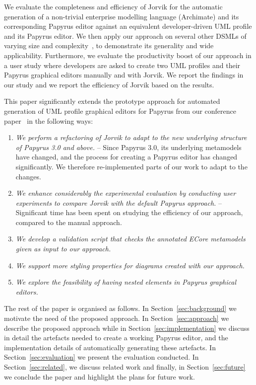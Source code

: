 We evaluate the completeness and efficiency of Jorvik for the automatic generation of a non-trivial enterprise modelling language (Archimate) and its corresponding Papyrus editor against an equivalent developer-driven UML profile and its Papyrus editor. 
We then apply our approach on several other DSMLs of varying size and complexity~\cite{williams2013metamodels}, to demonstrate its generality and wide applicability. 
Furthermore, we evaluate the productivity boost of our approach in a user study where developers are asked to create two UML profiles and their Papyrus graphical editors manually and with Jorvik.
We report the findings in our study and we report the efficiency of Jorvik based on the results. 

This paper significantly extends the prototype approach for automated generation of UML profile graphical editors for Papyrus from our conference paper~\cite{zolotas2018towards} in the following ways:
\begin{enumerate}
	\item \textit{We perform a refactoring of Jorvik to adapt to the new underlying structure of Papyrus 3.0 and above.} --
	Since Papyrus 3.0, its underlying metamodels have changed, and the process for creating a Papyrus editor has changed significantly. 
	We therefore re-implemented parts of our work to adapt to the changes. 
	\item \textit{We enhance considerably the experimental evaluation by conducting user experiments to compare Jorvik with the default Papyrus approach.} --
	Significant time has been spent on studying the efficiency of our approach, compared to the manual approach.
	\item \textit{We develop a validation script that checks the annotated ECore metamodels given as input to our approach.}
	\item \textit{We support more styling properties for diagrams created with our approach.}
	\item \textit{We explore the feasibility of having nested elements in Papyrus graphical editors.} 
\end{enumerate}
The rest of the paper is organised as follows. 
In Section~\ref{sec:background} we motivate the need of the proposed approach. 
In Section~\ref{sec:approach} we describe the proposed approach while 
in Section~\ref{sec:implementation} we discuss in detail the artefacts needed to create a working Papyrus editor, and the implementation details of automatically generating these artefacts. 
In Section~\ref{sec:evaluation} we present the evaluation conducted.
In Section~\ref{sec:related}, we discuss related work and finally, in Section~\ref{sec:future} we conclude the paper and highlight the plans for future work.